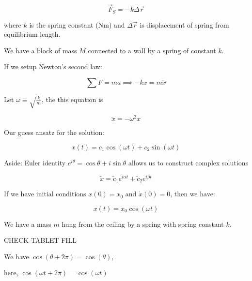 \begin{equation}
	\vec F_S = - k \Delta \vec r
\end{equation}

where $k$ is the spring constant ($\si{\N\m}$) and $\Delta \vec r$ is displacement of spring from equilibrium length.

\begin{example}
	We have a block of mass $M$ connected to a wall by a spring of constant $k$.
\end{example}

If we setup Newton's second law:

\begin{equation}
	\sum F = ma \implies -kx = m \ddot x
\end{equation}

Let $\omega \equiv \sqrt{\frac{k}{m}}$, the this equation is 

\begin{equation}
	\boxed{\ddot x = -\omega^2 x}
\end{equation}

Our guess ansatz for the solution:

\begin{equation} \label{eq:shm-general-sol}
	x(t) = c_1 \cos(\omega t) + c_2 \sin(\omega t)
\end{equation}

Aside: Euler identity $e^{i\theta} = \cos\theta + i\sin\theta$ allows us to construct complex solutions

\begin{equation}
	\tilde{x} = \tilde{c}_1 e^{i\alpha t} + \tilde{c}_2 e^{i\beta t}
\end{equation}

If we have initial conditions $x(0) = x_0$ and $\dot x(0) = 0$, then we have:

\begin{equation}
	x(t) = x_0\cos(\omega t)
\end{equation}

\begin{example}
	We have a mass $m$ hung from the ceiling by a spring with spring constant $k$.
\end{example}

\begin{sol}
	CHECK TABLET FILL
\end{sol}

We have $\cos(\theta + 2\pi) = \cos(\theta)$,

here, $\cos(\omega t + 2 \pi) = \cos(\omega t)$

